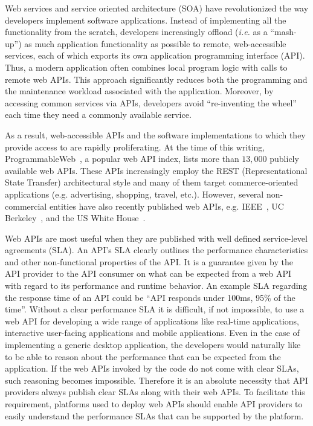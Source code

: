 Web services and service oriented architecture (SOA) have
revolutionized the way developers implement software applications.
Instead of implementing all the functionality from the scratch, developers
increasingly offload ({\em i.e.} as a ``mash-up'') as much application functionality 
as possible to remote,
web-accessible services, each of which exports its own application programming
interface (API). Thus, a modern application often combines local program logic
with calls to remote web APIs.
This approach significantly reduces both the programming and
the maintenance workload associated with the application.
Moreover, by accessing common services via APIs, developers avoid ``re-inventing the
wheel'' each time they need a commonly available service.

As a result, web-accessible APIs and the software implementations to which
they provide access to are rapidly proliferating.
At the time of this writing, 
ProgrammableWeb~\cite{pweb}, a popular web API index, lists more than $13,000$
publicly available web APIs.
These APIs increasingly employ the REST (Representational State Transfer) architectural style and 
many of them target commerce-oriented applications (e.g. advertising, shopping, travel, etc.).
However, several non-commercial entities have also recently published web 
APIs, e.g. IEEE~\cite{ieeeapis}, UC Berkeley~\cite{ucbapis}, and the US White
House~\cite{whitehouseapis}. 

Web APIs are most useful when they are published with well defined service-level agreements (SLA). 
An API's SLA clearly outlines the performance characteristics and other non-functional 
properties of the API. It is a guarantee given by the API provider to the API consumer on what can be
expected from a web API with regard to its performance and runtime behavior. An example SLA regarding
the response time of an API could be ``API responds under 100ms, 95\% of the time''.
Without a clear performance SLA it is difficult, if not impossible,
to use a web API for developing a wide range of applications like real-time applications, interactive
user-facing applications and mobile applications. Even in the case of implementing a generic desktop
application, the developers would naturally like to be able to reason about
the performance that can be expected from the application. If the web APIs invoked by the code do
not come with clear SLAs, such reasoning becomes impossible. Therefore it is an absolute
necessity that API providers always publish clear SLAs along with their web APIs. To
facilitate this requirement, platforms used to deploy web APIs should enable API providers to 
easily understand the performance SLAs that can be supported by the platform.


